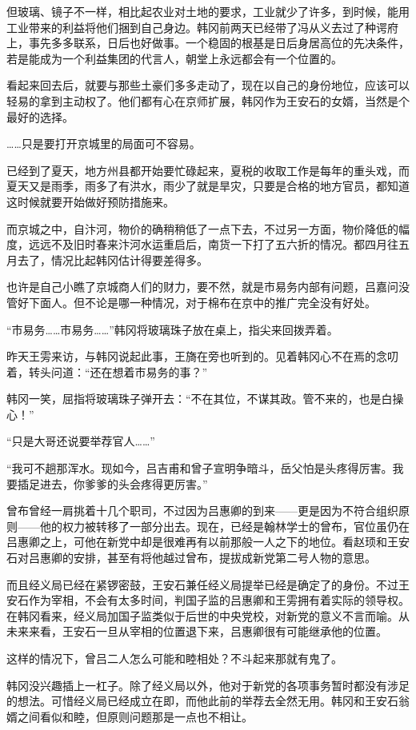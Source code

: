 但玻璃、镜子不一样，相比起农业对土地的要求，工业就少了许多，到时候，能用工业带来的利益将他们捆到自己身边。韩冈前两天已经带了冯从义去过了种谔府上，事先多多联系，日后也好做事。一个稳固的根基是日后身居高位的先决条件，若是能成为一个利益集团的代言人，朝堂上永远都会有一个位置的。

看起来回去后，就要与那些土豪们多多走动了，现在以自己的身份地位，应该可以轻易的拿到主动权了。他们都有心在京师扩展，韩冈作为王安石的女婿，当然是个最好的选择。

……只是要打开京城里的局面可不容易。

已经到了夏天，地方州县都开始要忙碌起来，夏税的收取工作是每年的重头戏，而夏天又是雨季，雨多了有洪水，雨少了就是旱灾，只要是合格的地方官员，都知道这时候就要开始做好预防措施来。

而京城之中，自汴河，物价的确稍稍低了一点下去，不过另一方面，物价降低的幅度，远远不及旧时春来汴河水运重启后，南货一下打了五六折的情况。都四月往五月去了，情况比起韩冈估计得要差得多。

也许是自己小瞧了京城商人们的财力，要不然，就是市易务内部有问题，吕嘉问没管好下面人。但不论是哪一种情况，对于棉布在京中的推广完全没有好处。

“市易务……市易务……”韩冈将玻璃珠子放在桌上，指尖来回拨弄着。

昨天王雱来访，与韩冈说起此事，王旖在旁也听到的。见着韩冈心不在焉的念叨着，转头问道：“还在想着市易务的事？”

韩冈一笑，屈指将玻璃珠子弹开去：“不在其位，不谋其政。管不来的，也是白操心！”

“只是大哥还说要举荐官人……”

“我可不趟那浑水。现如今，吕吉甫和曾子宣明争暗斗，岳父怕是头疼得厉害。我要插足进去，你爹爹的头会疼得更厉害。”

曾布曾经一肩挑着十几个职司，不过因为吕惠卿的到来——更是因为不符合组织原则——他的权力被转移了一部分出去。现在，已经是翰林学士的曾布，官位虽仍在吕惠卿之上，可他在新党中却是很难再有以前那般一人之下的地位。看赵顼和王安石对吕惠卿的安排，甚至有将他越过曾布，提拔成新党第二号人物的意思。

而且经义局已经在紧锣密鼓，王安石兼任经义局提举已经是确定了的身份。不过王安石作为宰相，不会有太多时间，判国子监的吕惠卿和王雱拥有着实际的领导权。在韩冈看来，经义局加国子监类似于后世的中央党校，对新党的意义不言而喻。从未来来看，王安石一旦从宰相的位置退下来，吕惠卿很有可能继承他的位置。

这样的情况下，曾吕二人怎么可能和睦相处？不斗起来那就有鬼了。

韩冈没兴趣插上一杠子。除了经义局以外，他对于新党的各项事务暂时都没有涉足的想法。可惜经义局已经成立在即，而他此前的举荐去全然无用。韩冈和王安石翁婿之间看似和睦，但原则问题那是一点也不相让。


